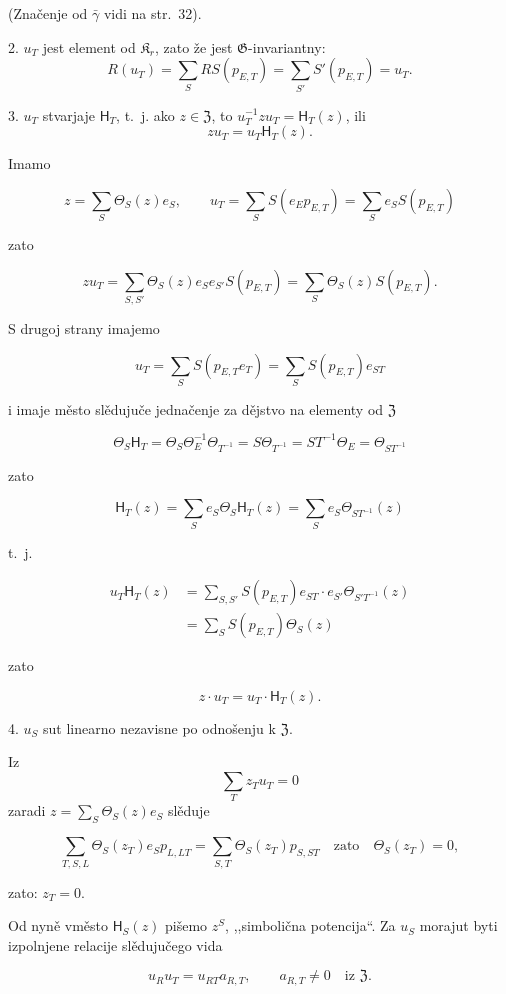 \documentclass[11pt]{article}
\begin{document}
(Značenje od \(\bar{\gamma}\) vidi na str.~32).

2. \(u_T\) jest element od \(\mathfrak K_r\), zato že jest \(\mathfrak G\)-invariantny:
\[
R(u_T)=\sum_S RS(p_{E,T})=\sum_{S'} S'(p_{E,T})=u_T.
\]

3. \(u_T\) stvarjaje \(\mathsf{H}_T\), t.~j. ako \(z\in\mathfrak Z\), to \(u_T^{-1}zu_T=\mathsf{H}_T(z)\), ili
\[
z u_T=u_T \mathsf{H}_T(z).
\]

Imamo

\[
z=\sum_S\Theta_S(z)e_S,\qquad
u_T=\sum_S S(e_Ep_{E,T})=\sum_S e_S S(p_{E,T})
\]

zato

\[
zu_T=\sum_{S,S'}\Theta_S(z)e_Se_{S'}S(p_{E,T})
=\sum_S\Theta_S(z)S(p_{E,T}).
\]

S drugoj strany imajemo

\[
u_T=\sum_S S(p_{E,T}e_T)=\sum_S S(p_{E,T})e_{ST}
\]

i imaje město slědujuče jednačenje za dějstvo na elementy od \(\mathfrak Z\)

\[
\Theta_S \mathsf{H}_T=\Theta_S\Theta_E^{-1}\Theta_{T^{-1}}
=S\Theta_{T^{-1}}=ST^{-1}\Theta_E=\Theta_{ST^{-1}}
\]

zato

\[
\mathsf{H}_T(z)=\sum_S e_S\Theta_S \mathsf{H}_T(z)=\sum_S e_S\Theta_{ST^{-1}}(z)
\]

t.~j.

\[
\begin{aligned}
u_T\mathsf{H}_T(z)
&=\sum_{S,S'} S(p_{E,T})e_{ST}\cdot e_{S'}\Theta_{S'T^{-1}}(z)\\
&=\sum_S S(p_{E,T})\Theta_S(z)
\end{aligned}
\]

zato

\[
z\cdot u_T=u_T\cdot \mathsf{H}_T(z).
\]

4. \(u_S\) sut linearno nezavisne po odnošenju k \(\mathfrak Z\).

Iz
\[
\sum_T z_Tu_T=0
\]
zaradi \(z=\sum_S\Theta_S(z)e_S\) slěduje

\[
\sum_{T,S,L}\Theta_S(z_T)e_Sp_{L,LT}
=\sum_{S,T}\Theta_S(z_T)p_{S,ST}\quad\text{zato}\quad
\Theta_S(z_T)=0,
\]

zato: \(z_T=0\).

Od nyně vměsto \(\mathsf{H}_S(z)\) pišemo \(z^S\), ,,simbolična potencija``. Za \(u_S\) morajut byti izpolnjene relacije slědujučego vida

\[
u_Ru_T=u_{RT}a_{R,T},\qquad a_{R,T}\ne0\quad\text{iz }\mathfrak Z.
\]
\end{document}
